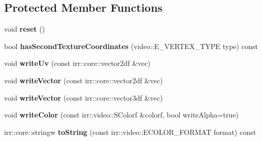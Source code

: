 \subsection*{Protected Member Functions}
\begin{DoxyCompactItemize}
\item 
\hypertarget{classirr_1_1scene_1_1_c_collada_mesh_writer_a63826685bc5198dba16d525e4ca793d2}{void {\bfseries reset} ()}\label{classirr_1_1scene_1_1_c_collada_mesh_writer_a63826685bc5198dba16d525e4ca793d2}

\item 
\hypertarget{classirr_1_1scene_1_1_c_collada_mesh_writer_ad4c57cc8b3e976e87ee19aff4eb6d2bf}{bool {\bfseries has\-Second\-Texture\-Coordinates} (video\-::\-E\-\_\-\-V\-E\-R\-T\-E\-X\-\_\-\-T\-Y\-P\-E type) const }\label{classirr_1_1scene_1_1_c_collada_mesh_writer_ad4c57cc8b3e976e87ee19aff4eb6d2bf}

\item 
\hypertarget{classirr_1_1scene_1_1_c_collada_mesh_writer_aa8e5b230a3091eb2f887499592279b79}{void {\bfseries write\-Uv} (const irr\-::core\-::vector2df \&vec)}\label{classirr_1_1scene_1_1_c_collada_mesh_writer_aa8e5b230a3091eb2f887499592279b79}

\item 
\hypertarget{classirr_1_1scene_1_1_c_collada_mesh_writer_a367ec2be9a2bb5fe160a51a8987359bc}{void {\bfseries write\-Vector} (const irr\-::core\-::vector2df \&vec)}\label{classirr_1_1scene_1_1_c_collada_mesh_writer_a367ec2be9a2bb5fe160a51a8987359bc}

\item 
\hypertarget{classirr_1_1scene_1_1_c_collada_mesh_writer_a6a1b1839a31502a96d0d3d14a7286067}{void {\bfseries write\-Vector} (const irr\-::core\-::vector3df \&vec)}\label{classirr_1_1scene_1_1_c_collada_mesh_writer_a6a1b1839a31502a96d0d3d14a7286067}

\item 
\hypertarget{classirr_1_1scene_1_1_c_collada_mesh_writer_a0bb975088b2dca6d1fa25d5812bf06d1}{void {\bfseries write\-Color} (const irr\-::video\-::\-S\-Colorf \&colorf, bool write\-Alpha=true)}\label{classirr_1_1scene_1_1_c_collada_mesh_writer_a0bb975088b2dca6d1fa25d5812bf06d1}

\item 
\hypertarget{classirr_1_1scene_1_1_c_collada_mesh_writer_a47d333893c47fbc5ce914f72eb9b96ff}{irr\-::core\-::stringw {\bfseries to\-String} (const irr\-::video\-::\-E\-C\-O\-L\-O\-R\-\_\-\-F\-O\-R\-M\-A\-T format) const }\label{classirr_1_1scene_1_1_c_collada_mesh_writer_a47d333893c47fbc5ce914f72eb9b96ff}


\end{DoxyCompactItemize}
